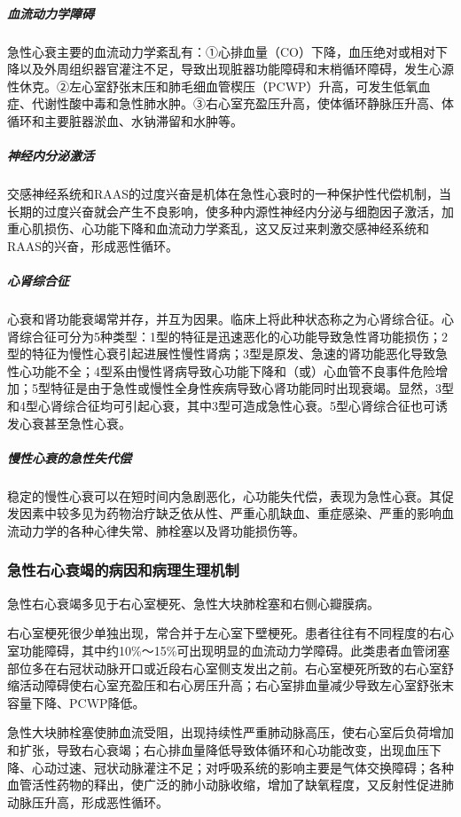 \subparagraph{血流动力学障碍}

急性心衰主要的血流动力学紊乱有：①心排血量（CO）下降，血压绝对或相对下降以及外周组织器官灌注不足，导致出现脏器功能障碍和末梢循环障碍，发生心源性休克。②左心室舒张末压和肺毛细血管楔压（PCWP）升高，可发生低氧血症、代谢性酸中毒和急性肺水肿。③右心室充盈压升高，使体循环静脉压升高、体循环和主要脏器淤血、水钠滞留和水肿等。

\subparagraph{神经内分泌激活}

交感神经系统和RAAS的过度兴奋是机体在急性心衰时的一种保护性代偿机制，当长期的过度兴奋就会产生不良影响，使多种内源性神经内分泌与细胞因子激活，加重心肌损伤、心功能下降和血流动力学紊乱，这又反过来刺激交感神经系统和RAAS的兴奋，形成恶性循环。

\subparagraph{心肾综合征}

心衰和肾功能衰竭常并存，并互为因果。临床上将此种状态称之为心肾综合征。心肾综合征可分为5种类型：1型的特征是迅速恶化的心功能导致急性肾功能损伤；2型的特征为慢性心衰引起进展性慢性肾病；3型是原发、急速的肾功能恶化导致急性心功能不全；4型系由慢性肾病导致心功能下降和（或）心血管不良事件危险增加；5型特征是由于急性或慢性全身性疾病导致心肾功能同时出现衰竭。显然，3型和4型心肾综合征均可引起心衰，其中3型可造成急性心衰。5型心肾综合征也可诱发心衰甚至急性心衰。

\subparagraph{慢性心衰的急性失代偿}

稳定的慢性心衰可以在短时间内急剧恶化，心功能失代偿，表现为急性心衰。其促发因素中较多见为药物治疗缺乏依从性、严重心肌缺血、重症感染、严重的影响血流动力学的各种心律失常、肺栓塞以及肾功能损伤等。

\subsubsection{急性右心衰竭的病因和病理生理机制}

急性右心衰竭多见于右心室梗死、急性大块肺栓塞和右侧心瓣膜病。

右心室梗死很少单独出现，常合并于左心室下壁梗死。患者往往有不同程度的右心室功能障碍，其中约10\%～15\%可出现明显的血流动力学障碍。此类患者血管闭塞部位多在右冠状动脉开口或近段右心室侧支发出之前。右心室梗死所致的右心室舒缩活动障碍使右心室充盈压和右心房压升高；右心室排血量减少导致左心室舒张末容量下降、PCWP降低。

急性大块肺栓塞使肺血流受阻，出现持续性严重肺动脉高压，使右心室后负荷增加和扩张，导致右心衰竭；右心排血量降低导致体循环和心功能改变，出现血压下降、心动过速、冠状动脉灌注不足；对呼吸系统的影响主要是气体交换障碍；各种血管活性药物的释出，使广泛的肺小动脉收缩，增加了缺氧程度，又反射性促进肺动脉压升高，形成恶性循环。

